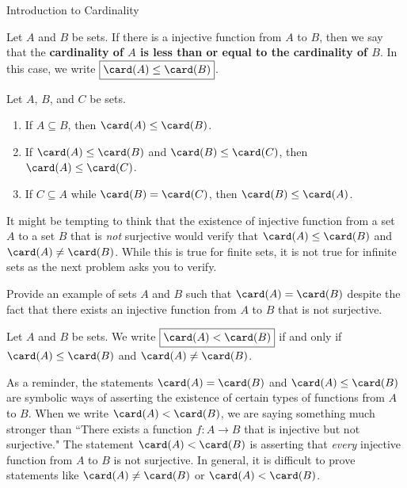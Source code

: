 \begin{section}{Introduction to Cardinality}
\begin{definition}
Let $A$ and $B$ be sets. If there is a injective function from $A$ to $B$, then we say that the \textbf{cardinality of $A$ is less than or equal to the cardinality of $B$}. In this case, we write $\boxed{\card(A)\leq\card(B)}$.
\end{definition}

\begin{theorem}
Let $A$, $B$, and $C$ be sets.
\begin{enumerate}[label=\textrm{(\alph*)}]
\item If $A\subseteq B$, then $\card(A)\leq \card(B)$.
\item If $\card(A)\leq \card(B)$ and $\card(B)\leq \card(C)$, then $\card(A)\leq \card(C)$.
\item If $C\subseteq A$ while $\card(B)=\card(C)$, then $\card(B)\leq \card(A)$.
\end{enumerate}
\end{theorem}

It might be tempting to think that the existence of injective function from a set $A$ to a set $B$ that is \emph{not} surjective would verify that $\card(A)\leq \card(B)$ and $\card(A)\neq \card(B)$. While this is true for finite sets, it is not true for infinite sets as the next problem asks you to verify.

\begin{problem}
Provide an example of sets $A$ and $B$ such that $\card(A)=\card(B)$ despite the fact that there exists an injective function from $A$ to $B$ that is not surjective.
\end{problem}

\begin{definition}
Let $A$ and $B$ be sets. We write $\boxed{\card(A)< \card(B)}$ if and only if $\card(A)\leq \card(B)$ and $\card(A)\neq \card(B)$.
\end{definition}

As a reminder, the statements $\card(A)= \card(B)$ and $\card(A)\leq \card(B)$ are symbolic ways of asserting the existence of certain types of functions from $A$ to $B$. When we write $\card(A)<\card(B)$, we are saying something much stronger than ``There exists a function $f:A\to B$ that is injective but not surjective." The statement $\card(A)<\card(B)$ is asserting that \emph{every} injective function from $A$ to $B$ is not surjective. In general, it is difficult to prove statements like $\card(A)\neq \card(B)$ or $\card(A)<\card(B)$.

\end{section}